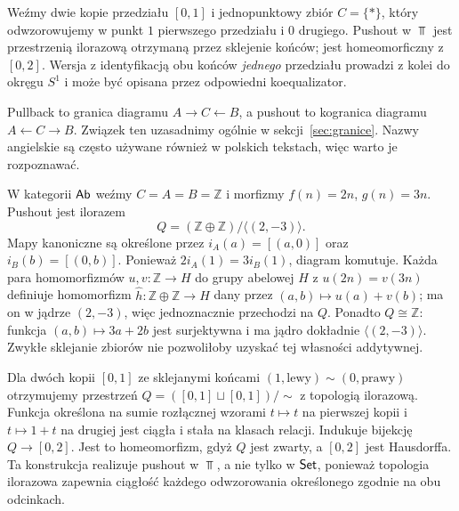 \begin{przyklad}
Weźmy dwie kopie przedziału $[0,1]$ i jednopunktowy zbiór $C=\{*\}$, który odwzorowujemy w punkt $1$ pierwszego przedziału i $0$ drugiego. Pushout w $\Top$ jest przestrzenią ilorazową otrzymaną przez sklejenie końców; jest homeomorficzny z $[0,2]$. Wersja z identyfikacją obu końców \emph{jednego} przedziału prowadzi z kolei do okręgu $S^1$ i może być opisana przez odpowiedni koequalizator.
\end{przyklad}

\begin{uwaga}
Pullback to granica diagramu $A\to C\leftarrow B$, a pushout to kogranica diagramu $A\leftarrow C\to B$. Związek ten uzasadnimy ogólnie w sekcji~\ref{sec:granice}. Nazwy angielskie są często używane również w polskich tekstach, więc warto je rozpoznawać.
\end{uwaga}


\begin{przyklad}
W kategorii $\mathsf{Ab}$ weźmy $C=A=B=\mathbb Z$ i morfizmy $f(n)=2n$, $g(n)=3n$. Pushout jest ilorazem
\[
Q=(\mathbb Z\oplus\mathbb Z)/\langle(2,-3)\rangle.
\]
Mapy kanoniczne są określone przez $i_A(a)=[(a,0)]$ oraz $i_B(b)=[(0,b)]$. Ponieważ $2i_A(1)=3i_B(1)$, diagram komutuje. Każda para homomorfizmów $u,v:\mathbb Z\to H$ do grupy abelowej $H$ z $u(2n)=v(3n)$ definiuje homomorfizm $\widehat h:\mathbb Z\oplus\mathbb Z\to H$ dany przez $(a,b)\mapsto u(a)+v(b)$; ma on w jądrze $(2,-3)$, więc jednoznacznie przechodzi na $Q$. Ponadto $Q\cong\mathbb Z$: funkcja $(a,b)\mapsto3a+2b$ jest surjektywna i ma jądro dokładnie $\langle(2,-3)\rangle$. Zwykłe sklejanie zbiorów nie pozwoliłoby uzyskać tej własności addytywnej.
\end{przyklad}

\begin{przyklad}
Dla dwóch kopii $[0,1]$ ze sklejanymi końcami $(1,\mathrm{lewy})\sim(0,\mathrm{prawy})$ otrzymujemy przestrzeń $Q=([0,1]\sqcup[0,1])/{\sim}$ z topologią ilorazową. Funkcja określona na sumie rozłącznej wzorami $t\mapsto t$ na pierwszej kopii i $t\mapsto1+t$ na drugiej jest ciągła i stała na klasach relacji. Indukuje bijekcję $Q\to[0,2]$. Jest to homeomorfizm, gdyż $Q$ jest zwarty, a $[0,2]$ jest Hausdorffa. Ta konstrukcja realizuje pushout w $\Top$, a nie tylko w $\mathsf{Set}$, ponieważ topologia ilorazowa zapewnia ciągłość każdego odwzorowania określonego zgodnie na obu odcinkach.
\end{przyklad}


